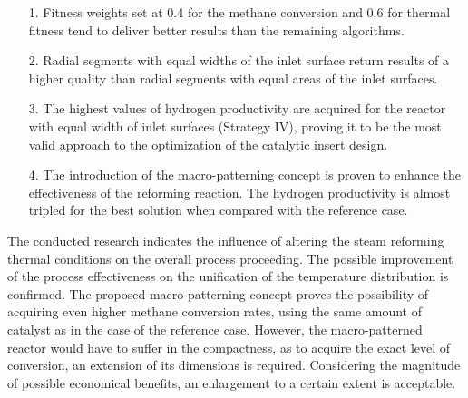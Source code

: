 \documentclass[preprint,12pt]{elsarticle}
\begin{document}
\begin{itemize}
\item [1.] Fitness weights set at 0.4 for the methane conversion and 0.6 for thermal fitness tend to deliver better results than the remaining algorithms.  
\item[2.] Radial segments with equal widths of the inlet surface return results of a higher quality than radial segments with equal areas of the inlet surfaces.
\item[3.] The highest values of hydrogen productivity are acquired for the reactor with equal width of inlet surfaces (Strategy IV),  proving it to be the most valid approach to the optimization of the catalytic insert design.
\item[4.] The introduction of the macro-patterning concept is proven to enhance the effectiveness of the reforming reaction. The hydrogen productivity is almost tripled for the best solution when compared with the reference case.
\end{itemize}

The conducted research indicates the influence of altering the steam reforming thermal conditions on the overall process proceeding. The possible improvement of the process effectiveness on the unification of the temperature distribution is confirmed. The proposed macro-patterning concept proves the possibility of acquiring even higher methane conversion rates, using the same amount of catalyst as in the case of the reference case. However, the macro-patterned reactor would have to suffer in the compactness, as to acquire the exact level of conversion, an extension of its dimensions is required. Considering the magnitude of possible economical benefits, an enlargement to a certain extent is acceptable. 

\clearpage

 





\end{document}
